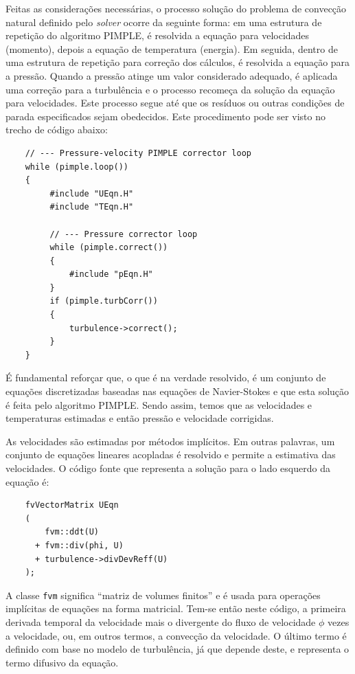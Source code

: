 \documentclass[12pt,openright,twoside,a4paper,english,french,spanish,brazil]{abntex2}
\begin{document}
Feitas as considerações necessárias, o processo solução do problema de convecção 
natural definido pelo \textit{solver} ocorre da seguinte forma: em uma estrutura de 
repetição do algoritmo PIMPLE, é resolvida a equação para velocidades (momento), 
depois a equação de temperatura (energia). Em seguida, dentro de uma estrutura 
de repetição para correção dos cálculos, é resolvida a equação para a pressão. Quando 
a pressão atinge um valor considerado adequado, é aplicada uma correção 
para a turbulência e o processo recomeça da solução da equação para velocidades. 
Este processo segue até que os resíduos ou outras condições de parada especificados 
sejam obedecidos. Este procedimento pode ser visto no trecho de código abaixo:

\begin{verbatim}
    // --- Pressure-velocity PIMPLE corrector loop
    while (pimple.loop())
    {
         #include "UEqn.H"
         #include "TEqn.H"
 
         // --- Pressure corrector loop
         while (pimple.correct())
         {
             #include "pEqn.H"
         }
         if (pimple.turbCorr())
         {
             turbulence->correct();
         }
    }
\end{verbatim}

É fundamental reforçar que, o que é na verdade resolvido, é um conjunto de equações discretizadas 
baseadas nas equações de Navier-Stokes e que esta solução é feita pelo algoritmo PIMPLE. Sendo assim, 
temos que as velocidades e temperaturas estimadas e então pressão e velocidade corrigidas. 

As velocidades são estimadas por métodos implícitos. Em outras palavras, um conjunto de equações 
lineares acopladas é resolvido e permite a estimativa das velocidades. O código fonte que 
representa a solução para o lado esquerdo da equação é:

\begin{verbatim}
    fvVectorMatrix UEqn
    (
        fvm::ddt(U)
      + fvm::div(phi, U)
      + turbulence->divDevReff(U)
    );
\end{verbatim}

A classe \texttt{fvm} significa ``matriz de volumes finitos'' e é usada para operações implícitas 
de equações na forma matricial. Tem-se então neste código, a primeira derivada temporal da velocidade 
mais o divergente do fluxo de velocidade $\phi$ vezes a velocidade, ou, em outros termos, 
a convecção da velocidade. O último termo é definido com base no modelo de turbulência, já que depende deste, 
e representa o termo difusivo da equação.
\end{document}
